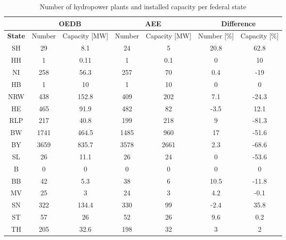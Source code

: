 \begin{table}
\footnotesize 
 \centering
 \caption[Number of hydropower plants and installed capacity per federal state]{Number of hydropower plants and installed capacity per federal state}
 \label{oedb_aee_diff}
 \begin{tabular}{|c|cc|cc| cc|}
  \cline{2-7}
  \multicolumn{0}{c|}{} &\multicolumn{2}{c}{\textbf{OEDB \cite{oedb}}}&\multicolumn{2}{|c|}{\textbf{AEE \cite{aee}}}&\multicolumn{2}{c|}{\textbf{Difference}} \\
  \hline
  \textbf{State} & Number 	& 	Capacity [\unit{MW}] 	&	Number 	& 	Capacity [\unit{MW}] 	&	Number [\unit{\%}] 	&	Capacity [\unit{\%}] \\
  \hline
  SH	&	29	&	8.1		&	24	&	5		&	20.8		&	62.8	\\
  HH	&	1	&	0.11		&	1	&	0.1		&	0		&	10	\\
  NI	&	258	&	56.3		&	257	&	70		&	0.4		&	-19	\\
  HB	&	1	&	10		&	1	&	10		&	0		&	0	\\
  NRW	&	438	&	152.8		&	409	&	202		&	7.1		&	-24.3	\\
  HE	&	465	&	91.9		&	482	&	82		&	-3.5		&	12.1	\\
  RLP	&	217	&	40.8		&	199	&	218		&	9		&	-81.3	\\
  BW	&	1741	&	464.5		&	1485	&	960		&	17		&	-51.6	\\	
  BY	&	3659	&	835.7		&	3578	&	2661		&	2.3		&	-68.6	\\
  SL	&	26	&	11.1		&	26	&	24		&	0		&	-53.6	\\
  B	&	0	&	0		&	0	&	0		&	0		&	0	\\
  BB	&	42	&	5.3		&	38	&	6		&	10.5		&	-11.8	\\
  MV	&	25	&	3		&	24	&	3		&	4.2		&	-0.1	\\
  SN	&	322	&	134.4		&	330	&	99		&	-2.4		&	35.8	\\
  ST	&	57	&	26		&	52	&	26		&	9.6		&	0.2	\\
  TH	&	205	&	32.6		&	198	&	32		&	3		&	2	\\
  \hline
 \end{tabular} 
\end{table}




